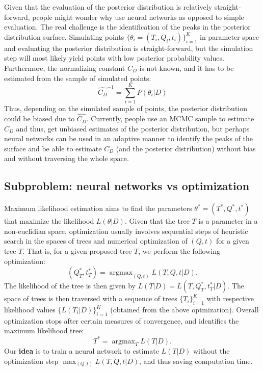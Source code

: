 \documentclass[]{article}
\DeclareMathOperator{\argmax}{argmax}
\begin{document}
Given that the evaluation of the posterior distribution is relatively
straight-forward, people might wonder why use neural networks as opposed
to simple evaluation. The real challenge is the identification of the
peaks in the posterior distribution surface. Simulating points
\(\{\theta_i = (T_i,Q_i,t_i)\}_{i=1}^K\) in parameter space and
evaluating the posterior distribution is straight-forward, but the
simulation step will most likely yield points with low posterior
probability values. Furthermore, the normalizing constant \(C_D\) is not
known, and it has to be estimated from the sample of simulated points:
\[
\widehat{C_D}^{-1} = \sum_{i=1}^K P(\theta_i|D)
\] Thus, depending on the simulated sample of points, the posterior
distribution could be biased due to \(\widehat{C_D}\). Currently, people
use an MCMC sample to estimate \(C_D\) and thus, get unbiased estimates
of the posterior distribution, but perhaps neural networks can be used
in an adaptive manner to identify the peaks of the surface and be able
to estimate \(C_D\) (and the posterior distribution) without bias and
without traversing the whole space.

\hypertarget{subproblem-neural-networks-vs-optimization}{%
\subsection{Subproblem: neural networks vs
optimization}\label{subproblem-neural-networks-vs-optimization}}

Maximum likelihood estimation aims to find the parameters
\(\theta^* = (T^*,Q^*,t^*)\) that maximize the likelihood
\(L(\theta|D)\). Given that the tree \(T\) is a parameter in a
non-euclidian space, optimization usually involves sequential steps of
heuristic search in the spaces of trees and numerical optimization of
\((Q,t)\) for a given tree \(T\). That is, for a given proposed tree
\(T\), we perform the following optimization: \[
(Q^*_T,t^*_T) = \argmax_{(Q,t)} L(T,Q,t|D).
\] The likelihood of the tree is then given by
\(L(T|D) = L(T,Q^*_T,t^*_T|D)\). The space of trees is then traversed
with a sequence of trees \(\{T_i\}_{i=1}^K\) with respective likelihood
values \(\{L(T_i|D)\}_{i=1}^K\) (obtained from the above optmization).
Overall optimization stops after certain measures of convergence, and
identifies the maximum likelihood tree: \[
T^* = \argmax_T L(T|D).
\] Our \textbf{idea} is to train a neural network to estimate \(L(T|D)\)
without the optimization step \(\max_{(Q,t)} L(T,Q,t|D)\), and thus
saving computation time.
\end{document}
